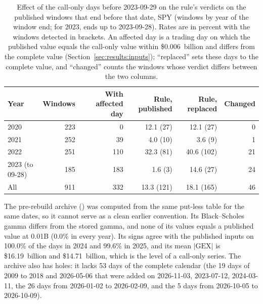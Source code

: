 \begin{table}[!htbp]
\centering
\caption{Effect of the call-only days before 2023-09-29 on the rule's verdicts on the published windows that end before that date, SPY (windows by year of the window end; for 2023, ends up to 2023-09-28). Rates are in percent with the windows detected in brackets. An affected day is a trading day on which the published value equals the call-only value within \$0.006~billion and differs from the complete value (Section~\ref{sec:results:inputs}); ``replaced'' sets these days to the complete value, and ``changed'' counts the windows whose verdict differs between the two columns.}
\label{tab:gaps}
\footnotesize
\setlength{\tabcolsep}{4pt}
\begin{tabular}{@{}lrrrrr@{}}
\toprule
Year & Windows & With affected day & Rule, published & Rule, replaced & Changed \\
\midrule
2020 & 223 & 0 & 12.1 (27) & 12.1 (27) & 0 \\
2021 & 252 & 39 & 4.0 (10) & 3.6 (9) & 1 \\
2022 & 251 & 110 & 32.3 (81) & 40.6 (102) & 21 \\
2023 (to 09-28) & 185 & 183 & 1.6 (3) & 14.6 (27) & 24 \\
\midrule
All & 911 & 332 & 13.3 (121) & 18.1 (165) & 46 \\
\bottomrule
\end{tabular}
\end{table}

The pre-rebuild archive () was computed from the same put-less table for the same dates, so it cannot serve as a clean earlier convention. Its Black--Scholes gamma differs from the stored gamma, and none of its values equals a published value at 0.01B (0.0\% in every year). Its signs agree with the published inputs on 100.0\% of the days in 2024 and 99.6\% in 2025, and its mean $|\mathrm{GEX}|$ is \$16.19~billion and \$14.71~billion, which is the level of a call-only series. The archive also has holes: it lacks 53 days of the complete calendar (the 19 days of 2009 to 2018 and 2026-05-06 that were added on 2026-11-03, 2023-07-12, 2024-03-11, the 26 days from 2026-01-02 to 2026-02-09, and the 5 days from 2026-10-05 to 2026-10-09).

